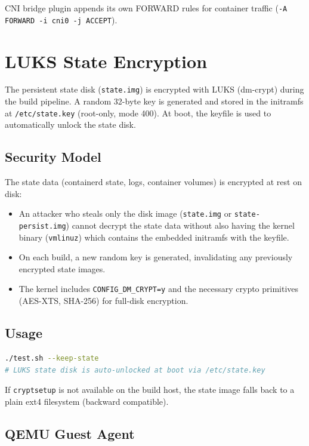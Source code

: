 CNI bridge plugin appends its own FORWARD rules for container traffic
(\texttt{-A FORWARD -i cni0 -j ACCEPT}).

\section{LUKS State Encryption}

The persistent state disk (\texttt{state.img}) is encrypted with
LUKS (dm-crypt) during the build pipeline. A random 32-byte key is
generated and stored in the initramfs at \texttt{/etc/state.key}
(root-only, mode 400). At boot, the keyfile is used to automatically
unlock the state disk.

\subsection{Security Model}

The state data (containerd state, logs, container volumes) is
encrypted at rest on disk:

\begin{itemize}[nosep]
  \item An attacker who steals only the disk image (\texttt{state.img}
        or \texttt{state-persist.img}) cannot decrypt the state data
        without also having the kernel binary (\texttt{vmlinuz}) which
        contains the embedded initramfs with the keyfile.
  \item On each build, a new random key is generated, invalidating any
        previously encrypted state images.
  \item The kernel includes \texttt{CONFIG\_DM\_CRYPT=y} and the
        necessary crypto primitives (AES-XTS, SHA-256) for full-disk
        encryption.
\end{itemize}

\subsection{Usage}

\begin{lstlisting}[language=bash]
./test.sh --keep-state
# LUKS state disk is auto-unlocked at boot via /etc/state.key
\end{lstlisting}

If \texttt{cryptsetup} is not available on the build host, the state
image falls back to a plain ext4 filesystem (backward compatible).

\subsection{QEMU Guest Agent}

